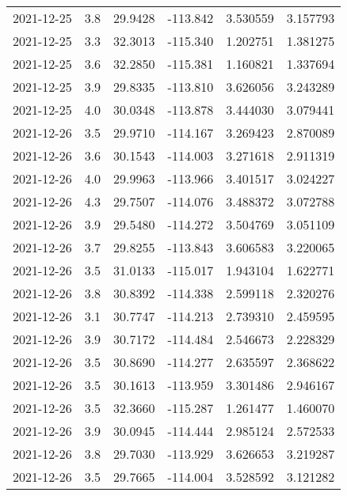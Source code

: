 \begin{tabular}{lrrrrr}
2021-12-25 &       3.8 &  29.9428 &  -113.842 &         3.530559 &         3.157793 \\
2021-12-25 &       3.3 &  32.3013 &  -115.340 &         1.202751 &         1.381275 \\
2021-12-25 &       3.6 &  32.2850 &  -115.381 &         1.160821 &         1.337694 \\
2021-12-25 &       3.9 &  29.8335 &  -113.810 &         3.626056 &         3.243289 \\
2021-12-25 &       4.0 &  30.0348 &  -113.878 &         3.444030 &         3.079441 \\
2021-12-26 &       3.5 &  29.9710 &  -114.167 &         3.269423 &         2.870089 \\
2021-12-26 &       3.6 &  30.1543 &  -114.003 &         3.271618 &         2.911319 \\
2021-12-26 &       4.0 &  29.9963 &  -113.966 &         3.401517 &         3.024227 \\
2021-12-26 &       4.3 &  29.7507 &  -114.076 &         3.488372 &         3.072788 \\
2021-12-26 &       3.9 &  29.5480 &  -114.272 &         3.504769 &         3.051109 \\
2021-12-26 &       3.7 &  29.8255 &  -113.843 &         3.606583 &         3.220065 \\
2021-12-26 &       3.5 &  31.0133 &  -115.017 &         1.943104 &         1.622771 \\
2021-12-26 &       3.8 &  30.8392 &  -114.338 &         2.599118 &         2.320276 \\
2021-12-26 &       3.1 &  30.7747 &  -114.213 &         2.739310 &         2.459595 \\
2021-12-26 &       3.9 &  30.7172 &  -114.484 &         2.546673 &         2.228329 \\
2021-12-26 &       3.5 &  30.8690 &  -114.277 &         2.635597 &         2.368622 \\
2021-12-26 &       3.5 &  30.1613 &  -113.959 &         3.301486 &         2.946167 \\
2021-12-26 &       3.5 &  32.3660 &  -115.287 &         1.261477 &         1.460070 \\
2021-12-26 &       3.9 &  30.0945 &  -114.444 &         2.985124 &         2.572533 \\
2021-12-26 &       3.8 &  29.7030 &  -113.929 &         3.626653 &         3.219287 \\
2021-12-26 &       3.5 &  29.7665 &  -114.004 &         3.528592 &         3.121282 \\

\end{tabular}
